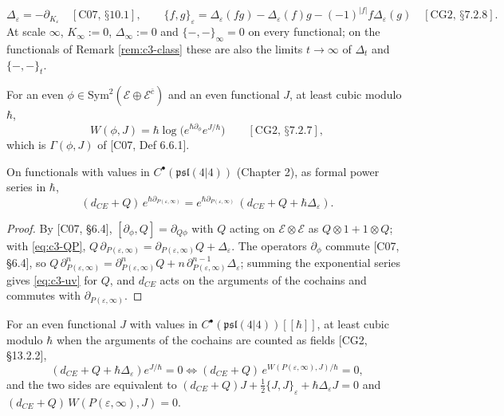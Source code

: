 \begin{definition}
\label{def:c3-delta}
\[
\Delta_\varepsilon=-\partial_{K_\varepsilon}\quad[\text{C07, §10.1}],\qquad \{f,g\}_\varepsilon=\Delta_\varepsilon(fg)-\Delta_\varepsilon(f)g-(-1)^{|f|}f\Delta_\varepsilon(g)\quad[\text{CG2, §7.2.8}].
\]
At scale $\infty$, $K_\infty:=0$, $\Delta_\infty:=0$ and $\{-,-\}_\infty=0$ on every functional; on the functionals of Remark \ref{rem:c3-class} these are also the limits $t\to\infty$ of $\Delta_t$ and $\{-,-\}_t$.
\end{definition}

\begin{definition}
\label{def:c3-W}
For an even $\phi\in\mathrm{Sym}^2(\mathscr E\oplus\mathscr E^{\bar c})$ and an even functional $J$, at least cubic modulo $\hbar$,
\[
W(\phi,J)=\hbar\log\big(e^{\hbar\partial_\phi}e^{J/\hbar}\big)\qquad[\text{CG2, §7.2.7}],
\]
which is $\Gamma(\phi,J)$ of [C07, Def 6.6.1].
\end{definition}

\begin{theorem}
\label{thm:c3-uv}
On functionals with values in $C^\bullet(\mathfrak{psl}(4|4))$ (Chapter 2), as formal power series in $\hbar$,
\begin{equation}
(d_{CE}+Q)\,e^{\hbar\partial_{P(\varepsilon,\infty)}}=e^{\hbar\partial_{P(\varepsilon,\infty)}}\,(d_{CE}+Q+\hbar\Delta_\varepsilon).
\label{eq:c3-uv}
\end{equation}
\end{theorem}

\begin{proof}
By [C07, §6.4], $[\partial_\phi,Q]=\partial_{Q\phi}$ with $Q$ acting on $\mathscr E\otimes\mathscr E$ as $Q\otimes1+1\otimes Q$; with \eqref{eq:c3-QP}, $Q\,\partial_{P(\varepsilon,\infty)}=\partial_{P(\varepsilon,\infty)}Q+\Delta_\varepsilon$. The operators $\partial_\phi$ commute [C07, §6.4], so $Q\,\partial^n_{P(\varepsilon,\infty)}=\partial^n_{P(\varepsilon,\infty)}Q+n\,\partial^{n-1}_{P(\varepsilon,\infty)}\Delta_\varepsilon$; summing the exponential series gives \eqref{eq:c3-uv} for $Q$, and $d_{CE}$ acts on the arguments of the cochains and commutes with $\partial_{P(\varepsilon,\infty)}$.
\end{proof}

\begin{corollary}
\label{cor:c3-qme}
For an even functional $J$ with values in $C^\bullet(\mathfrak{psl}(4|4))[[\hbar]]$, at least cubic modulo $\hbar$ when the arguments of the cochains are counted as fields [CG2, §13.2.2],
\[
(d_{CE}+Q+\hbar\Delta_\varepsilon)e^{J/\hbar}=0\iff(d_{CE}+Q)\,e^{W(P(\varepsilon,\infty),J)/\hbar}=0,
\]
and the two sides are equivalent to $(d_{CE}+Q)J+\tfrac12\{J,J\}_\varepsilon+\hbar\Delta_\varepsilon J=0$ and $(d_{CE}+Q)\,W(P(\varepsilon,\infty),J)=0$.
\end{corollary}

